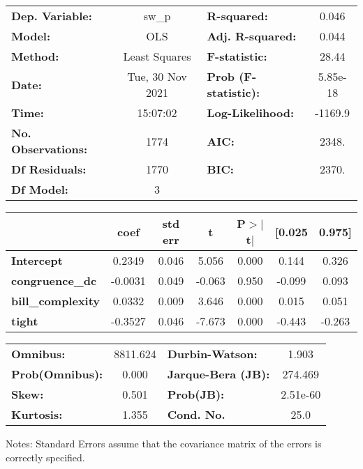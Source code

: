 \begin{center}
\begin{tabular}{lclc}
\toprule
\textbf{Dep. Variable:}    &      sw\_p       & \textbf{  R-squared:         } &     0.046   \\
\textbf{Model:}            &       OLS        & \textbf{  Adj. R-squared:    } &     0.044   \\
\textbf{Method:}           &  Least Squares   & \textbf{  F-statistic:       } &     28.44   \\
\textbf{Date:}             & Tue, 30 Nov 2021 & \textbf{  Prob (F-statistic):} &  5.85e-18   \\
\textbf{Time:}             &     15:07:02     & \textbf{  Log-Likelihood:    } &   -1169.9   \\
\textbf{No. Observations:} &        1774      & \textbf{  AIC:               } &     2348.   \\
\textbf{Df Residuals:}     &        1770      & \textbf{  BIC:               } &     2370.   \\
\textbf{Df Model:}         &           3      & \textbf{                     } &             \\
\bottomrule
\end{tabular}
\begin{tabular}{lcccccc}
                          & \textbf{coef} & \textbf{std err} & \textbf{t} & \textbf{P$> |$t$|$} & \textbf{[0.025} & \textbf{0.975]}  \\
\midrule
\textbf{Intercept}        &       0.2349  &        0.046     &     5.056  &         0.000        &        0.144    &        0.326     \\
\textbf{congruence\_dc}   &      -0.0031  &        0.049     &    -0.063  &         0.950        &       -0.099    &        0.093     \\
\textbf{bill\_complexity} &       0.0332  &        0.009     &     3.646  &         0.000        &        0.015    &        0.051     \\
\textbf{tight}            &      -0.3527  &        0.046     &    -7.673  &         0.000        &       -0.443    &       -0.263     \\
\bottomrule
\end{tabular}
\begin{tabular}{lclc}
\textbf{Omnibus:}       & 8811.624 & \textbf{  Durbin-Watson:     } &    1.903  \\
\textbf{Prob(Omnibus):} &   0.000  & \textbf{  Jarque-Bera (JB):  } &  274.469  \\
\textbf{Skew:}          &   0.501  & \textbf{  Prob(JB):          } & 2.51e-60  \\
\textbf{Kurtosis:}      &   1.355  & \textbf{  Cond. No.          } &     25.0  \\
\bottomrule
\end{tabular}
\end{center}

Notes: \newline
 [1] Standard Errors assume that the covariance matrix of the errors is correctly specified.